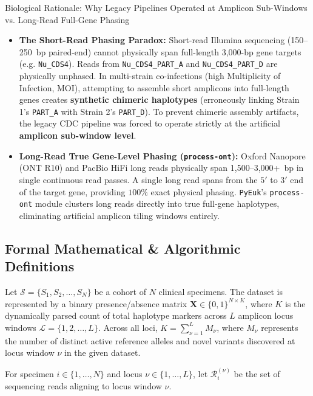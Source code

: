 \documentclass[11pt,a4paper]{article}
\begin{document}
\begin{conceptbox}{Biological Rationale: Why Legacy Pipelines Operated at Amplicon Sub-Windows vs. Long-Read Full-Gene Phasing}
\begin{itemize}[leftmargin=*]
    \item \textbf{The Short-Read Phasing Paradox:} Short-read Illumina sequencing (150--250~bp paired-end) cannot physically span full-length 3,000-bp gene targets (e.g. \texttt{Nu\_CDS4}). Reads from \texttt{Nu\_CDS4\_PART\_A} and \texttt{Nu\_CDS4\_PART\_D} are physically unphased. In multi-strain co-infections (high Multiplicity of Infection, MOI), attempting to assemble short amplicons into full-length genes creates \textbf{synthetic chimeric haplotypes} (erroneously linking Strain 1's \texttt{PART\_A} with Strain 2's \texttt{PART\_D}). To prevent chimeric assembly artifacts, the legacy CDC pipeline was forced to operate strictly at the artificial \textbf{amplicon sub-window level}.
    \item \textbf{Long-Read True Gene-Level Phasing (\texttt{process-ont}):} Oxford Nanopore (ONT R10) and PacBio HiFi long reads physically span 1,500--3,000+~bp in single continuous read passes. A single long read spans from the $5'$ to $3'$ end of the target gene, providing $100\%$ exact physical phasing. \texttt{PyEuk}'s \texttt{process-ont} module clusters long reads directly into true full-gene haplotypes, eliminating artificial amplicon tiling windows entirely.
\end{itemize}
\end{conceptbox}

\subsection{Formal Mathematical \& Algorithmic Definitions}

Let $\mathcal{S} = \{S_1, S_2, \dots, S_N\}$ be a cohort of $N$ clinical specimens. The dataset is represented by a binary presence/absence matrix $\mathbf{X} \in \{0, 1\}^{N \times K}$, where $K$ is the dynamically parsed count of total haplotype markers across $L$ amplicon locus windows $\mathcal{L} = \{1, 2, \dots, L\}$. Across all loci, $K = \sum_{\nu=1}^L M_\nu$, where $M_\nu$ represents the number of distinct active reference alleles and novel variants discovered at locus window $\nu$ in the given dataset.

For specimen $i \in \{1, \dots, N\}$ and locus $\nu \in \{1, \dots, L\}$, let $\mathcal{R}_{i}^{(\nu)}$ be the set of sequencing reads aligning to locus window $\nu$.
\end{document}
